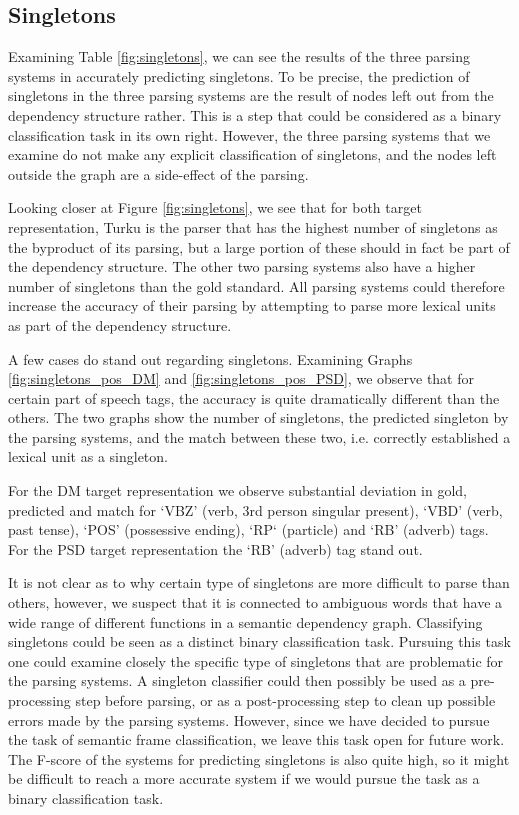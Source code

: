 \subsection{Singletons}

Examining Table \ref{fig:singletons}, we can see the results of the three parsing systems in accurately predicting singletons. To be precise, the prediction of singletons in the three parsing systems are the result of nodes left out from the dependency structure rather. This is a step that could be considered as a binary classification task in its own right. However, the three parsing systems that we examine do not make any explicit classification of singletons, and the nodes left outside the graph are a side-effect of the parsing.

Looking closer at Figure \ref{fig:singletons}, we see that for both target representation, Turku is the parser that has the highest number of singletons as the byproduct of its parsing, but a large portion of these should in fact be part of the dependency structure. The other two parsing systems also have a higher number of singletons than the gold standard. All parsing systems could therefore increase the accuracy of their parsing by attempting to parse more lexical units as part of the dependency structure.

A few cases do stand out regarding singletons. Examining Graphs \ref{fig:singletons_pos_DM} and \ref{fig:singletons_pos_PSD}, we observe that for certain part of speech tags, the accuracy is quite dramatically different than the others. The two graphs show the number of singletons, the predicted singleton by the parsing systems, and the match between these two, i.e. correctly established a lexical unit as a singleton. 

For the DM target representation we observe substantial deviation in gold, predicted and match for `VBZ' (verb, 3rd person singular present), `VBD' (verb, past tense), `POS' (possessive ending), `RP` (particle) and `RB' (adverb) tags. For the PSD target representation the `RB' (adverb) tag stand out.

It is not clear as to why certain type of singletons are more difficult to parse than others, however, we suspect that it is connected to ambiguous words that have a wide range of different functions in a semantic dependency graph. Classifying singletons could be seen as a distinct binary classification task. Pursuing this task one could examine closely the specific type of singletons that are problematic for the parsing systems. A singleton classifier could then possibly be used as a pre-processing step before parsing, or as a post-processing step to clean up possible errors made by the parsing systems. However, since we have decided to pursue the task of semantic frame classification, we leave this task open for future work. The F-score of the systems for predicting singletons is also quite high, so it might be difficult to reach a more accurate system if we would pursue the task as a binary classification task.


